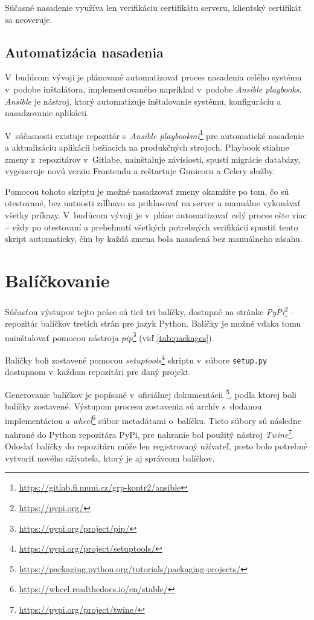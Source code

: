\documentclass[
  digital, %
  oneside, %
  table,   %
  lof,     %
  lot,   %
]{fithesis3}
\newcommand*{\footurl}[1]{\footnote{\url{#1}}}
\begin{document}
Súčasné nasadenie využíva len verifikáciu certifikátu serveru, klientský certifikát sa neoveruje.

\subsection{Automatizácia nasadenia}

V~budúcom vývoji je plánované automatizovať proces nasadenia celého systému v~podobe inštalátora, implementovaného napríklad v~podobe \emph{Ansible playbooks}. \emph{Ansible} je nástroj, ktorý automatizuje inštalovanie systému, konfiguráciu a nasadzovanie aplikácii\cite{ansible}. 

V~súčasnosti existuje repozitár s~\emph{Ansible playbookmi}\footnote{\url{https://gitlab.fi.muni.cz/grp-kontr2/ansible}} pre automatické nasadenie a aktualizáciu aplikácii bežiacich na produkčných strojoch. Playbook stiahne zmeny z~repozitárov v~Gitlabe, nainštaluje závislosti, spustí migrácie databázy, vygeneruje novú verziu Frontendu a reštartuje Gunicorn a Celery služby.

Pomocou tohoto skriptu je možné nasadzovať zmeny okamžite po tom, čo sú otestované, bez nutnosti zdĺhavo sa prihlasovať na server a manuálne vykonávať všetky príkazy. V~budúcom vývoji je v~pláne automatizovať celý proces ešte viac -- vždy po otestovaní a prebehnutí všetkých potrebných verifikácií spustiť tento skript automaticky, čím by každá zmena bola nasadená bez manuálneho zásahu.

\section{Balíčkovanie}

Súčasťou výstupov tejto práce sú tiež tri balíčky, dostupné na stránke \emph{PyPi}\footurl{https://pypi.org/} -- repozitár balíčkov tretích strán pre jazyk Python. Balíčky je možné vďaka tomu nainštalovať pomocou nástroja \emph{pip}\footurl{https://pypi.org/project/pip/} (viď \ref{tab:packages}).

Balíčky boli zostavené pomocou \emph{setuptools}\footurl{https://pypi.org/project/setuptools/} skriptu v~súbore \texttt{setup.py} dostupnom v~každom repozitári pre daný projekt.

Generovanie balíčkov je popísané v~oficiálnej dokumentácii \footurl{https://packaging.python.org/tutorials/packaging-projects/}, podľa ktorej boli balíčky zostavené. Výstupom procesu zostavenia sú archív s~dodanou implementáciou a \emph{wheel}\footurl{https://wheel.readthedocs.io/en/stable/} súbor metadátami o~balíčku. Tieto súbory sú následne nahrané do Python repozitára PyPi, pre nahranie bol použitý nástroj \emph{Twine}\footurl{https://pypi.org/project/twine/}. Odoslať balíčky do repozitáru môže len registrovaný užívateľ, preto bolo potrebné vytvoriť nového užívateľa, ktorý je aj správcom balíčkov.
\end{document}
